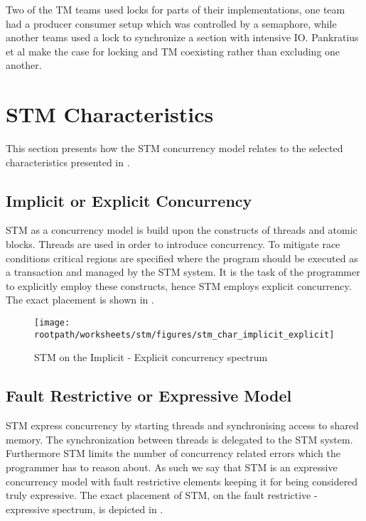 Two of the \ac{TM} teams used locks for parts of their implementations, one team had a producer consumer setup which was controlled by a semaphore, while another teams used a lock to synchronize a section with intensive \ac{IO}\cite[p. 5]{pankratius2009does}. Pankratius et al make the case for locking and \ac{TM} coexisting rather than excluding one another.

\section{\acs{STM} Characteristics}
\label{sec:stm_eval}
This section presents how the \ac{STM} concurrency model relates to the selected characteristics presented in . 

\subsection{Implicit or Explicit Concurrency}
\ac{STM} as a concurrency model is build upon the constructs of threads and atomic blocks. Threads are used in order to introduce concurrency. To mitigate race conditions critical regions are specified where the program should be executed as a transaction and managed by the \ac{STM} system. It is the task of the programmer to explicitly employ these constructs, hence \ac{STM} employs explicit concurrency. The exact placement is shown in .

\begin{figure}[htbp]
\centering
 \texttt{[image: \\rootpath/worksheets/stm/figures/stm\_char\_implicit\_explicit]} 
 \caption{\ac{STM} on the Implicit - Explicit concurrency spectrum}
\label{fig:stm_char_impli_expli}
\end{figure}

\subsection{Fault Restrictive or Expressive Model}
\ac{STM} express concurrency by starting threads and synchronising access to shared memory. The synchronization between threads is delegated to the \ac{STM} system. Furthermore \ac{STM} limits the number of concurrency related errors which the programmer has to reason about. As such we say that \ac{STM} is an expressive concurrency model with fault restrictive elements keeping it for being considered truly expressive. The exact placement of \ac{STM}, on the fault restrictive - expressive spectrum, is depicted in .

